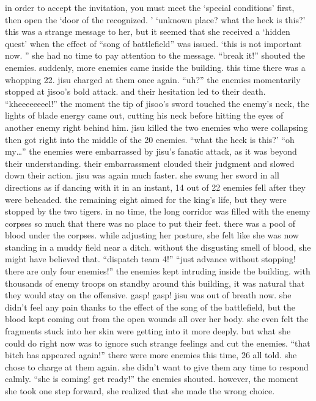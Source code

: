 in order to accept the invitation, you must meet the ‘special conditions’ first, then open the ‘door of the recognized.
’ ‘unknown place? what the heck is this?’ this was a strange message to her, but it seemed that she received a ‘hidden quest’ when the effect of “song of battlefield” was issued.
 ‘this is not important now.
” she had no time to pay attention to the message.
 “break it!” shouted the enemies.
 suddenly, more enemies came inside the building.
 this time there was a whopping 22.
 jisu charged at them once again.
 “uh?” the enemies momentarily stopped at jisoo’s bold attack.
 and their hesitation led to their death.
 “kheeeeeeeel!” the moment the tip of jisoo’s sword touched the enemy’s neck, the lights of blade energy came out, cutting his neck before hitting the eyes of another enemy right behind him.
 jisu killed the two enemies who were collapsing then got right into the middle of the 20 enemies.
 “what the heck is this?’ “oh my…” the enemies were embarrassed by jisu’s fanatic attack, as it was beyond their understanding.
 their embarrassment clouded their judgment and slowed down their action.
 jisu was again much faster.
 she swung her sword in all directions as if dancing with it in an instant, 14 out of 22 enemies fell after they were beheaded.
 the remaining eight aimed for the king’s life, but they were stopped by the two tigers.
 in no time, the long corridor was filled with the enemy corpses so much that there was no place to put their feet.
 there was a pool of blood under the corpses.
 while adjusting her posture, she felt like she was now standing in a muddy field near a ditch.
 without the disgusting smell of blood, she might have believed that.
 “dispatch team 4!” “just advance without stopping! there are only four enemies!” the enemies kept intruding inside the building.
 with thousands of enemy troops on standby around this building, it was natural that they would stay on the offensive.
 gasp! gasp! jisu was out of breath now.
 she didn’t feel any pain thanks to the effect of the song of the battlefield, but the blood kept coming out from the open wounds all over her body.
 she even felt the fragments stuck into her skin were getting into it more deeply.
 but what she could do right now was to ignore such strange feelings and cut the enemies.
 “that bitch has appeared again!” there were more enemies this time, 26 all told.
 she chose to charge at them again.
 she didn’t want to give them any time to respond calmly.
 “she is coming! get ready!” the enemies shouted.
 however, the moment she took one step forward, she realized that she made the wrong choice.
